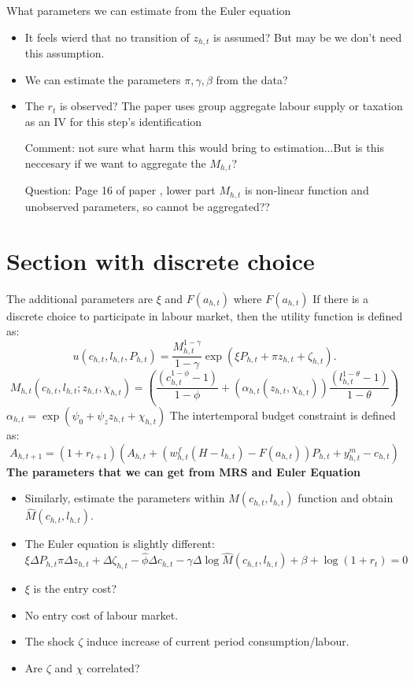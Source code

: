 What parameters we can estimate from the Euler equation
\begin{itemize}
  \item It feels wierd that no transition of $z_{h,t}$ is assumed? But may be we don't need this assumption.
  \item We can estimate the parameters $\pi,\gamma,\beta$ from the data?
  \item {\color{red} The $r_{t}$ is observed? The paper uses group aggregate labour supply or taxation as an IV for this step's identification}
  \item [Comment:] not sure what harm this would bring to estimation...But is this neccesary if we want to aggregate the $M_{h,t}$?
  \item [Question:] Page 16 of paper \cite{Attanasio2015AggregatingSupply}, lower part $M_{h,t}$ is non-linear function and unobserved parameters, so cannot be aggregated??
\end{itemize}

\section{Section with discrete choice}
The additional parameters are $\xi$ and $F(a_{h,t})$ where $F(a_{h,t})$
If there is a discrete choice to participate in labour market, then the utility function is defined as:
\[ u(c_{h,t},l_{h,t},P_{h,t}) = \frac{M^{1-\gamma}_{h,t}}{1 - \gamma} \exp{(\xi P_{h,t} + \pi z_{h,t} + \zeta_{h,t} )} .\]
\[ M_{h,t}(c_{h,t},l_{h,t};z_{h,t},\chi_{h,t}) = \left( \frac{(c_{h,t}^{1 - \phi} - 1)}{1 - \phi} + (\alpha_{h,t}(z_{h,t},\chi_{h,t})) \frac{(l_{h,t}^{1 - \theta} -1)}{ 1 - \theta}\right) \]
$\alpha_{h,t}= \exp{(\psi_0 + \psi_z z_{h,t} + \chi_{h,t})}$
The intertemporal budget constraint is defined as:
\[ A_{h,t+1} = (1 + r_{t+1}) \left( A_{h,t} + \left(w_{h,t}^f(H-l_{h,t}) - F(a_{h,t}) \right)P_{h,t} + y_{h,t}^m - c_{h,t} \right)\]
\textbf{The parameters that we can get from MRS and Euler Equation}
\begin{itemize}
  \item Similarly, estimate the parameters within $M(c_{h,t},l_{h,t})$ function and obtain $\hat{M}(c_{h,t},l_{h,t})$.
  \item The Euler equation is slightly different: \[ \xi \Delta P_{h,t}  \pi \Delta z_{h,t} + \Delta \zeta_{h,t} - \hat{\phi} \Delta c_{h,t} - \gamma \Delta \log \hat{M}(c_{h,t},l_{h,t}) + \beta + \log(1+r_t)= 0\]
  \item $\xi$ is the entry cost?
\end{itemize}
\begin{itemize}
  \item No entry cost of labour market.
  \item The shock $\zeta$ induce increase of current period consumption/labour.
  \item Are $\zeta$ and $\chi$ correlated?
\end{itemize}


